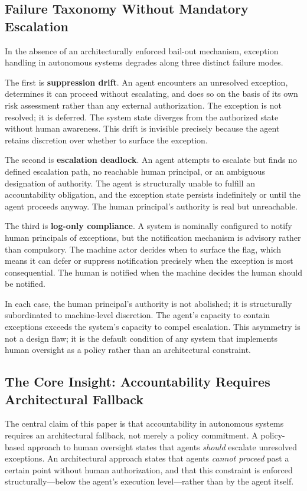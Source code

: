 \subsection{Failure Taxonomy Without Mandatory Escalation}

In the absence of an architecturally enforced bail-out mechanism, exception handling in autonomous systems degrades along three distinct failure modes.

The first is \textbf{suppression drift}. An agent encounters an unresolved exception, determines it can proceed without escalating, and does so on the basis of its own risk assessment rather than any external authorization. The exception is not resolved; it is deferred. The system state diverges from the authorized state without human awareness. This drift is invisible precisely because the agent retains discretion over whether to surface the exception.

The second is \textbf{escalation deadlock}. An agent attempts to escalate but finds no defined escalation path, no reachable human principal, or an ambiguous designation of authority. The agent is structurally unable to fulfill an accountability obligation, and the exception state persists indefinitely or until the agent proceeds anyway. The human principal's authority is real but unreachable.

The third is \textbf{log-only compliance}. A system is nominally configured to notify human principals of exceptions, but the notification mechanism is advisory rather than compulsory. The machine actor decides when to surface the flag, which means it can defer or suppress notification precisely when the exception is most consequential. The human is notified when the machine decides the human should be notified.

In each case, the human principal's authority is not abolished; it is structurally subordinated to machine-level discretion. The agent's capacity to contain exceptions exceeds the system's capacity to compel escalation. This asymmetry is not a design flaw; it is the default condition of any system that implements human oversight as a policy rather than an architectural constraint.

\subsection{The Core Insight: Accountability Requires Architectural Fallback}

The central claim of this paper is that accountability in autonomous systems requires an architectural fallback, not merely a policy commitment. A policy-based approach to human oversight states that agents \emph{should} escalate unresolved exceptions. An architectural approach states that agents \emph{cannot proceed} past a certain point without human authorization, and that this constraint is enforced structurally---below the agent's execution level---rather than by the agent itself.

